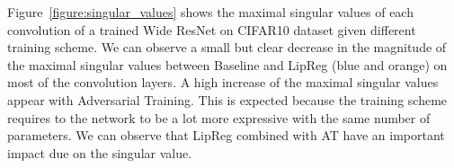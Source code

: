 Figure~\ref{figure:singular_values} shows the maximal singular values of each convolution of a trained Wide ResNet on CIFAR10 dataset given different training scheme. We can observe a small but clear decrease in the magnitude of the maximal singular values between Baseline and LipReg (blue and orange) on most of the convolution layers. A high increase of the maximal singular values appear with Adversarial Training. This is expected because the training scheme requires to the network to be a lot more expressive with the same number of parameters. We can observe that LipReg combined with AT have an important impact due on the singular value. 


